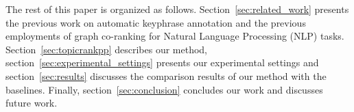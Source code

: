 
  The rest of this paper is organized as follows. Section~\ref{sec:related_work}
  presents the previous work on automatic keyphrase annotation and the previous
  employments of graph co-ranking for Natural Language Processing (NLP) tasks.
  Section~\ref{sec:topicrankpp} describes our method,
  section~\ref{sec:experimental_settings} presents our experimental settings and
  section~\ref{sec:results} discusses the comparison results of our method with
  the baselines. Finally, section~\ref{sec:conclusion} concludes our work and
  discusses future work.

